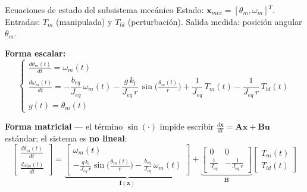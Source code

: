 \documentclass[aspectratio=169,t]{beamer}
\begin{document}
\begin{frame}{Ecuaciones de estado del subsistema mecánico}
{\small\color{uncGray}Estado: $\bm{x}_{mec}=[\theta_m,\omega_m]^T$. Entradas: $T_m$ (manipulada) y $T_{ld}$ (perturbación). Salida medida: posición angular $\theta_m$.}\par
\vspace{2mm}

\textbf{Forma escalar:}
\begin{equation*}
\begin{cases}
\frac{d\theta_m(t)}{dt} = \omega_m(t) \\[4pt]
\frac{d\omega_m(t)}{dt} = -\dfrac{b_{eq}}{J_{eq}}\,\omega_m(t) -\dfrac{g\,k_l}{J_{eq}\,r}\,\sin\!\big(\tfrac{\theta_m(t)}{r}\big) +\dfrac{1}{J_{eq}}\,T_m(t) -\dfrac{1}{J_{eq}\,r}\,T_{ld}(t) \\[6pt]
y(t) = \theta_m(t)
\end{cases}
\end{equation*}

\vspace{2mm}
\textbf{Forma matricial} --- el término $\sin(\cdot)$ impide escribir $\frac{d\bm{x}}{dt}=\bm{A}\bm{x}+\bm{B}\bm{u}$ estándar; el sistema es \textbf{no lineal}:
\begin{equation*}
\begin{bmatrix}\frac{d\theta_m(t)}{dt} \\ \frac{d\omega_m(t)}{dt}\end{bmatrix} =
\underbrace{\begin{bmatrix}\omega_m(t) \\[2pt] -\tfrac{g\,k_l}{J_{eq}\,r}\sin\!\big(\tfrac{\theta_m(t)}{r}\big) -\tfrac{b_{eq}}{J_{eq}}\,\omega_m(t)\end{bmatrix}}_{\bm{f}(\bm{x})}
+
\underbrace{\begin{bmatrix}0 & 0 \\[2pt] \tfrac{1}{J_{eq}} & -\tfrac{1}{J_{eq}\,r}\end{bmatrix}}_{\bm{B}}
\begin{bmatrix}T_m(t) \\ T_{ld}(t)\end{bmatrix}
\end{equation*}
\end{frame}

\end{document}
